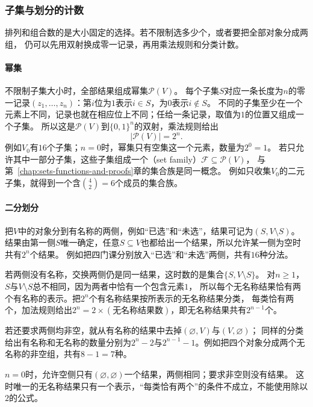 \subsubsection{子集与划分的计数}
\label{sec:comb-subset-partition-counts}

排列和组合数的是大小固定的选择。若不限制选多少个，或者要把全部对象分成两组，
仍可以先用双射换成零一记录，再用乘法规则和分类计数。

\paragraph{幂集}
\label{sec:comb-ordered-unordered}
不限制子集大小时，全部结果组成幂集$\mathcal P(V)$。
每个子集$S$对应一条长度为$n$的零一记录$(z_1,\ldots,z_n)$：第$i$位为$1$表示$i\in S$，为$0$表示$i\notin S$。
不同的子集至少在一个元素上不同，记录也就在相应位上不同；任给一条记录，取值为$1$的位置又组成一个子集。
所以这是$\mathcal P(V)$到$\{0,1\}^n$的双射，乘法规则给出
\begin{equation}
 |\mathcal P(V)|=2^n.
 \label{eq:comb-power-set-count}
\end{equation}
例如$V_0$有$16$个子集；$n=0$时，幂集只有空集这一个元素，数量为$2^0=1$。
若只允许其中一部分子集，这些子集组成一个（set family）$\mathcal F\subseteq\mathcal P(V)$，
与第~\ref{chap:sets-functions-and-proofs}章的集合族是同一概念。
例如只收集$V_0$的二元子集，就得到一个含$\binom42=6$个成员的集合族。

\paragraph{二分划分}
把$V$中的对象分到有名称的两侧，例如“已选”和“未选”，结果可记为$(S,V\setminus S)$。
结果由第一侧$S$唯一确定，任意$S\subseteq V$也都给出一个结果，所以允许某一侧为空时共有$2^n$个结果。
例如把四门课分别放入“已选”和“未选”两侧，共有$16$种分法。

若两侧没有名称，交换两侧仍是同一结果，这时数的是集合$\{S,V\setminus S\}$。
对$n\geq1$，$S$与$V\setminus S$总不相同，因为两者中恰有一个包含元素$1$，
所以每个无名称结果恰有两个有名称的表示。把$2^n$个有名称结果按所表示的无名称结果分类，
每类恰有两个，加法规则给出$2^n=2\times(\text{无名称结果数})$，即无名称结果共有$2^{n-1}$个。

若还要求两侧均非空，就从有名称的结果中去掉$(\varnothing,V)$与$(V,\varnothing)$；
同样的分类给出有名称和无名称的数量分别为$2^n-2$与$2^{n-1}-1$。例如把四个对象分成两个无名称的非空组，共有$8-1=7$种。

$n=0$时，允许空侧只有$(\varnothing,\varnothing)$一个结果，两侧相同；要求非空则没有结果。
这时唯一的无名称结果只有一个表示，“每类恰有两个”的条件不成立，不能使用除以$2$的公式。

